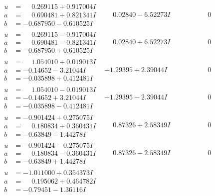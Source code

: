 \documentclass[1p]{elsarticle_modified}
\theoremstyle{definition}
\begin{document}
$$\begin{array}{c|c|c}
\begin{aligned}
u &= \phantom{-}0.269115 + 0.917004 I \\
a &= \phantom{-}0.690481 + 0.821341 I \\
b &= -0.687950 - 0.610525 I\end{aligned}
 & \phantom{-}0.02840 - 6.52273 I & \phantom{-0.000000 } 0 \\ \hline\begin{aligned}
u &= \phantom{-}0.269115 - 0.917004 I \\
a &= \phantom{-}0.690481 - 0.821341 I \\
b &= -0.687950 + 0.610525 I\end{aligned}
 & \phantom{-}0.02840 + 6.52273 I & \phantom{-0.000000 } 0 \\ \hline\begin{aligned}
u &= \phantom{-}1.054010 + 0.019013 I \\
a &= -0.14652 - 3.21044 I \\
b &= -0.035898 + 0.412481 I\end{aligned}
 & -1.29395 + 2.39044 I & \phantom{-0.000000 } 0 \\ \hline\begin{aligned}
u &= \phantom{-}1.054010 - 0.019013 I \\
a &= -0.14652 + 3.21044 I \\
b &= -0.035898 - 0.412481 I\end{aligned}
 & -1.29395 - 2.39044 I & \phantom{-0.000000 } 0 \\ \hline\begin{aligned}
u &= -0.901424 + 0.275075 I \\
a &= \phantom{-}0.180834 + 0.360431 I \\
b &= -0.63849 - 1.44278 I\end{aligned}
 & \phantom{-}0.87326 + 2.58349 I & \phantom{-0.000000 } 0 \\ \hline\begin{aligned}
u &= -0.901424 - 0.275075 I \\
a &= \phantom{-}0.180834 - 0.360431 I \\
b &= -0.63849 + 1.44278 I\end{aligned}
 & \phantom{-}0.87326 - 2.58349 I & \phantom{-0.000000 } 0 \\ \hline\begin{aligned}
u &= -1.011000 + 0.354373 I \\
a &= \phantom{-}0.195062 + 0.464782 I \\
b &= -0.79451 - 1.36116 I\end{aligned}

\end{array}$$
\end{document}
